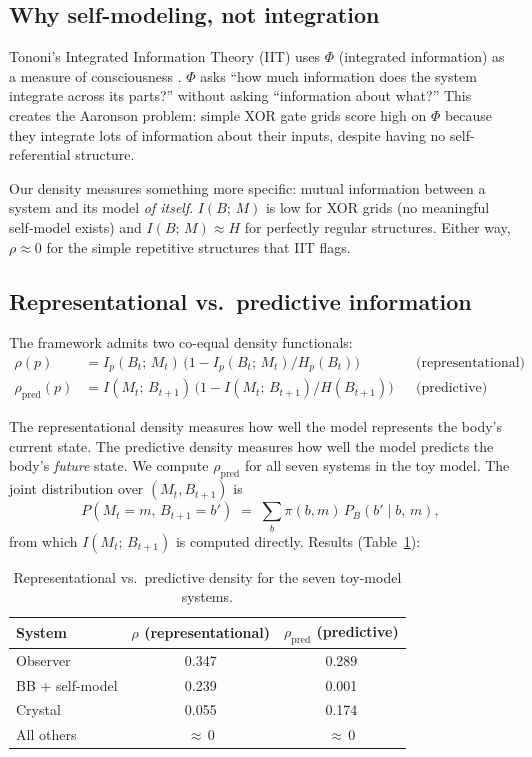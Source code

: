 \documentclass[12pt]{article}
\theoremstyle{remark}
\begin{document}
\subsection{Why self-modeling, not integration}

Tononi's Integrated Information Theory (IIT) uses $\Phi$ (integrated information) as a measure of consciousness \cite{tononi2016}. $\Phi$ asks ``how much information does the system integrate across its parts?'' without asking ``information about what?'' This creates the Aaronson problem: simple XOR gate grids score high on $\Phi$ because they integrate lots of information about their inputs, despite having no self-referential structure.

Our density measures something more specific: mutual information between a system and its model \emph{of itself}. $I(B;\,M)$ is low for XOR grids (no meaningful self-model exists) and $I(B;\,M) \approx H$ for perfectly regular structures. Either way, $\rho \approx 0$ for the simple repetitive structures that IIT flags.

\subsection{Representational vs.\ predictive information}\label{sec:pred}

The framework admits two co-equal density functionals:
\begin{align}
  \rho(p) &= I_p(B_t;\,M_t)\,\bigl(1 - I_p(B_t;\,M_t)/H_p(B_t)\bigr) & &\text{(representational)}\label{eq:rho-rep}\\[4pt]
  \rho_{\mathrm{pred}}(p) &= I(M_t;\,B_{t+1})\,\bigl(1 - I(M_t;\,B_{t+1})/H(B_{t+1})\bigr) & &\text{(predictive)}\label{eq:rho-pred}
\end{align}

The representational density measures how well the model represents the body's current state. The predictive density measures how well the model predicts the body's \emph{future} state. We compute $\rho_{\mathrm{pred}}$ for all seven systems in the toy model. The joint distribution over $(M_t, B_{t+1})$ is
\[
  P(M_t = m,\, B_{t+1} = b') \;=\; \sum_b \pi(b,m)\, P_B(b' \mid b,\, m),
\]
from which $I(M_t;\,B_{t+1})$ is computed directly. Results (Table~\ref{tab:pred}):

\begin{table}[ht]
\centering
\begin{tabular}{lcc}
\toprule
System & $\rho$ (representational) & $\rho_{\mathrm{pred}}$ (predictive) \\
\midrule
Observer         & 0.347 & 0.289 \\
BB + self-model  & 0.239 & 0.001 \\
Crystal          & 0.055 & 0.174 \\
All others       & ${\approx}\,0$  & ${\approx}\,0$  \\
\bottomrule
\end{tabular}
\caption{Representational vs.\ predictive density for the seven toy-model systems.}
\label{tab:pred}
\end{table}
\end{document}

